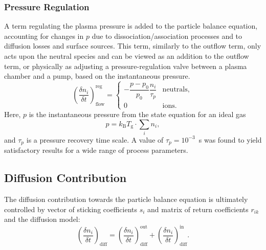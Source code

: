 \subsubsection{Pressure Regulation}
A term regulating the plasma pressure is added to the particle balance equation, accounting for changes in $p$ due
to dissociation/association processes and to diffusion losses and surface sources.
This term, similarly to the outflow term, only acts upon the neutral species and can be viewed as an addition to the
outflow term, or physically as adjusting a pressure-regulation valve between a plasma chamber and a pump,
based on the instantaneous pressure.
\begin{equation}
    \left( \frac{\delta n_{i}}{\delta t} \right)_{\mathrm{flow}} ^{\mathrm{reg}} =
    \begin{cases}
        -\dfrac{p - p_{0}}{p_{0}} \dfrac{n_{i}}{\tau_{p}} & \mathrm{neutrals}, \\
        0 & \mathrm{ions}.
    \end{cases}
\end{equation}
Here, $p$ is the instantaneous pressure from the state equation for an ideal gas
\begin{equation}
    p = k_{\mathrm{B}}T_{\mathrm{g}} \cdot \sum_{i} n_{i},
\end{equation}
and $\tau_{p}$ is a pressure recovery time scale.
A value of $\tau_p = 10^{-3}$~s was found to yield satisfactory results for a wide range of process
parameters.

\subsection{Diffusion Contribution}\label{subsec:03-diffusion-contribution}
The diffusion contribution towards the particle balance equation is ultimately controlled by vector of sticking
coefficients $s_{i}$ and matrix of return coefficients $r_{ik}$ and the diffusion model:
\begin{equation}
    \left( \frac{\delta n_{i}}{\delta t} \right)_{\mathrm{diff}} =
    \left( \frac{\delta n_{i}}{\delta t} \right)_{\mathrm{diff}}^{\mathrm{out}} +
    \left( \frac{\delta n_{i}}{\delta t} \right)_{\mathrm{diff}}^{\mathrm{in}}.
\end{equation}

